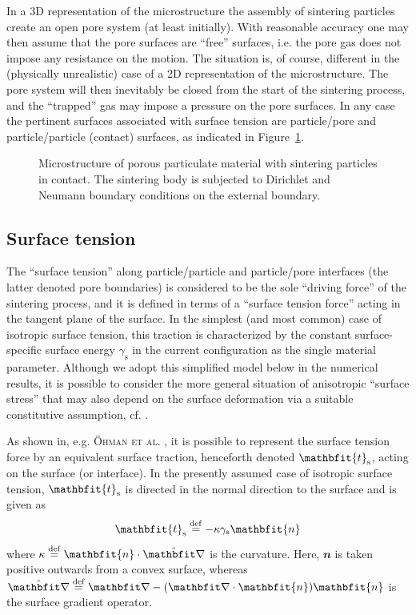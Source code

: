 \documentclass[12pt,a4paper,fleqn]{article}
\renewcommand{\ta}[1]{\mathbfit{#1}}
\newcommand{\figref}[1]{Figure~\ref{#1}}
\newcommand{\surf}{\mathrm{s}}
\begin{document}
In a 3D representation of the microstructure the assembly of sintering particles create an open pore system (at least initially). With reasonable accuracy one may then assume that the pore surfaces are ``free'' surfaces, i.e. the pore gas does not impose any resistance on the motion. The situation is, of course, different in the (physically unrealistic) case of a 2D representation of the microstructure. The pore system will then inevitably be closed from the start of the sintering process, and the ``trapped'' gas may impose a pressure on the pore surfaces. In any case the pertinent surfaces associated with surface tension are particle/pore and particle/particle (contact) surfaces, as indicated in \figref{fig:micro}.
\begin{figure}[th!]
    \centering
    
    \caption{Microstructure of porous particulate material with sintering particles in contact. The sintering body is subjected to Dirichlet and Neumann boundary conditions on the external boundary.}
    \label{fig:micro}
\end{figure}


\subsection{Surface tension}

The ``surface tension'' along particle/particle and particle/pore interfaces (the latter denoted pore boundaries) is considered to be the sole ``driving force'' of the sintering process, and it is defined in terms of a ``surface tension force'' acting in the tangent plane of the surface. In the simplest (and most common) case of isotropic surface tension, this traction is characterized by the constant surface-specific surface energy $\gamma_\surf$ in the current configuration as the single material parameter. Although we adopt this simplified model below in the numerical results, it is possible to consider the more general situation of anisotropic ``surface stress'' that may also depend on the surface deformation via a suitable constitutive assumption, cf. \cite{Steinmann2008:boundaryenergies}.

As shown in, e.g. \textsc{Öhman et al.} \cite{Ohman2011a}, it is possible to represent the surface tension force by an equivalent surface traction, henceforth denoted $\ta{t}_\fluct$, acting on the surface (or interface). In the presently assumed case of isotropic surface tension, $\ta{t}_\fluct$ is directed in the normal direction to the surface and is given as
\begin{equation}
    \ta{t}_\surf\defeq -\kappa\gamma_\surf\ta{n}
\label{eq103aKR}
\end{equation}
where $\kappa\defeq\ta{n}\cdot\hat{\diff}$ is the curvature. Here, $\ta{n}$ is taken positive outwards from a convex surface, whereas $\hat\diff \defeq \diff - (\diff\cdot\ta{n})\ta{n}$ is the surface gradient operator.
\end{document}
